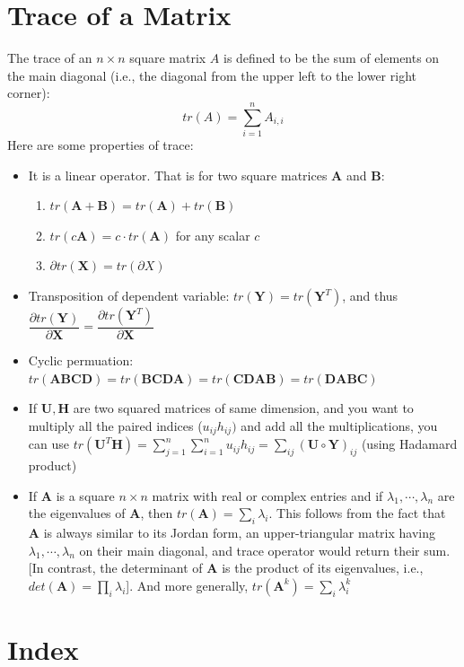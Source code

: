 \documentclass[conference,final,11pt,technote,onecolumn]{IEEEtran}\usepackage[]{graphicx}\usepackage[]{color}
\begin{document}
\section{Trace of a Matrix}
\label{term:trace_of_a_matrix}
The trace of an $n\times n$ square matrix $A$ is defined to be the sum of elements on the main diagonal (i.e., the diagonal from the upper left to the lower right corner):
\[
tr(A) = \sum_{i=1}^nA_{i,i}
\]
Here are some properties of trace:
\begin{itemize}
	\item It is a linear operator. That is for two square matrices $\mathbf{A}$ and $\mathbf{B}$: 
		\begin{enumerate}
			\item $tr(\mathbf{A}+\mathbf{B}) = tr(\mathbf{A}) + tr(\mathbf{B})$
			\item $tr(c\mathbf{A}) = c\cdot tr(\mathbf{A})$ for any scalar $c$
			\item $\partial tr(\mathbf{X}) = tr(\partial X)$
		\end{enumerate}
	\item Transposition of dependent variable: $tr(\mathbf{Y}) = tr(\mathbf{Y}^T)$, and thus $\dfrac{\partial tr(\mathbf{Y})}{\partial \mathbf{X}} = \dfrac{\partial tr(\mathbf{Y}^T)}{\partial \mathbf{X}}$
	\item Cyclic permuation: $tr(\mathbf{ABCD}) = tr(\mathbf{BCDA}) = tr(\mathbf{CDAB}) = tr(\mathbf{DABC})$
	\item If $\mathbf{U}, \mathbf{H}$ are two squared matrices of same dimension, and you want to multiply all the paired indices ($u_{ij}h_{ij})$ and add all the multiplications, you can use $tr({\mathbf{U}^T\mathbf{H}}) = \sum_{j=1}^n\sum_{i=1}^nu_{ij}h_{ij} = \sum_{ij}(\mathbf{U}\circ \mathbf{Y})_{ij}$ (using Hadamard product)
	\item If $\mathbf{A}$ is a square $n\times n$ matrix with real or complex entries and if $\lambda_1, \cdots, \lambda_n$ are the eigenvalues of $\mathbf{A}$, then $tr(\mathbf{A}) = \sum_i\lambda_i$. This follows from the fact that $\mathbf{A}$ is always similar to its Jordan form, an upper-triangular matrix having $\lambda_1, \cdots, \lambda_n$ on their main diagonal, and trace operator would return their sum. [In contrast, the determinant of $\mathbf{A}$ is the product of its eigenvalues, i.e., $det(\mathbf{A}) = \prod_i\lambda_i$]. And more generally, $tr(\mathbf{A}^k) = \sum_i\lambda^k_i$
\end{itemize}

	
	
	\pagebreak
	\section*{Index}
	\printindex
	
\end{document}

